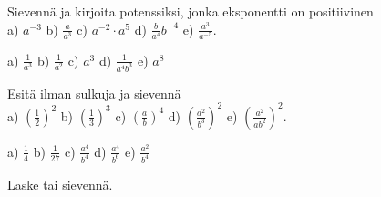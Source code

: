 \begin{tehtavasivu}
   
    
    \begin{tehtava}
         Sievennä ja kirjoita potenssiksi, jonka eksponentti on positiivinen\\
        a) $a^{-3}$ 
        b) $\frac{a}{a^3}$ 
        c) $a^{-2}\cdot a^5$ 
        d) $\frac{b}{a^4}b^{-4}$ 
        e) $\frac{a^3}{a^{-5}}$.
        
        \begin{vastaus}
            a) $\frac{1}{a^3}$ 
            b) $\frac{1}{a^2}$ 
            c) $a^3$ 
            d) $\frac{1}{a^4b^3}$ 
            e) $a^8$
        \end{vastaus}
    \end{tehtava}
    
    
    
    \begin{tehtava}
        Esitä ilman sulkuja ja sievennä \\
        a) $(\frac{1}{2})^2$ 
        b) $(\frac{1}{3})^3$ 
        c) $(\frac{a}{b})^4$ 
        d) $(\frac{a^2}{b^3})^2$ 
        e) $\left(\frac{a^2}{ab^2}\right)^2$.
        
        \begin{vastaus}
            a) $\frac{1}{4}$ 
            b) $\frac{1}{27}$ 
            c) $\frac{a^4}{b^4}$ 
            d) $\frac{a^4}{b^6}$ 
            e) $\frac{a^2}{b^4}$
        \end{vastaus}
    \end{tehtava}

Laske tai sievennä.

    \begin{tehtava}%
        \begin{alakohdatrivi}
		\end{alakohdatrivi}        
        \begin{vastaus}
        \begin{alakohdat}
        \end{alakohdat}
        \end{vastaus}
    \end{tehtava}    
    

\end{tehtavasivu}
